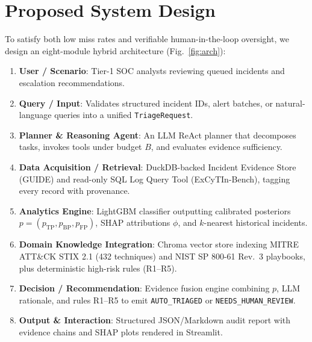 \section{Proposed System Design}

To satisfy both low miss rates and verifiable human-in-the-loop oversight, we design an eight-module hybrid architecture (Fig.~\ref{fig:arch}):
\begin{enumerate}
    \item \textbf{User / Scenario}: Tier-1 SOC analysts reviewing queued incidents and escalation recommendations.
    \item \textbf{Query / Input}: Validates structured incident IDs, alert batches, or natural-language queries into a unified \texttt{TriageRequest}.
    \item \textbf{Planner \& Reasoning Agent}: An LLM ReAct planner that decomposes tasks, invokes tools under budget $B$, and evaluates evidence sufficiency.
    \item \textbf{Data Acquisition / Retrieval}: DuckDB-backed Incident Evidence Store (GUIDE) and read-only SQL Log Query Tool (ExCyTIn-Bench), tagging every record with provenance.
    \item \textbf{Analytics Engine}: LightGBM classifier outputting calibrated posteriors $p = (p_{\text{TP}}, p_{\text{BP}}, p_{\text{FP}})$, SHAP attributions $\phi$, and $k$-nearest historical incidents.
    \item \textbf{Domain Knowledge Integration}: Chroma vector store indexing MITRE ATT\&CK STIX 2.1 (432 techniques) and NIST SP 800-61 Rev.~3 playbooks, plus deterministic high-risk rules (R1--R5).
    \item \textbf{Decision / Recommendation}: Evidence fusion engine combining $p$, LLM rationale, and rules R1--R5 to emit \texttt{AUTO\_TRIAGED} or \texttt{NEEDS\_HUMAN\_REVIEW}.
    \item \textbf{Output \& Interaction}: Structured JSON/Markdown audit report with evidence chains and SHAP plots rendered in Streamlit.
\end{enumerate}

